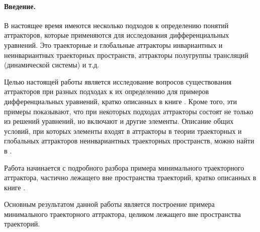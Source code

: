 





\paragraph{Введение.}
В настоящее время имеются несколько подходов к определению понятий аттракторов,
которые применяются для исследования дифференциальных уравнений.
Это траекторные и глобальные аттракторы инвариантных и неинвариантных траекторных пространств,
аттракторы полугруппы трансляций (динамической системы) и т.д.

Целью настоящей работы является исследование
вопросов существования аттракторов
при разных подходах к их определению для примеров дифференциальных уравнений,
кратко описанных в книге \cite{Vorotnikov}.
Кроме того, эти примеры показывают,
что при некоторых подходах аттракторы состоят не только из решений уравнений,
но включают и другие элементы.
Описание общих условий,
при которых элементы входят в аттракторы в теории траекторных и
глобальных аттракторов неинвариантных траекторных пространств,
можно найти в \cite{Kondratyev}.

Работа начинается с подробного разбора примера минимального траекторного аттрактора,
частично лежащего вне пространства траекторий,
кратко описанных в книге \cite{Vorotnikov}.

Основным результатом данной работы является построение примера минимального траекторного аттрактора,
целиком лежащего вне пространства траекторий.




